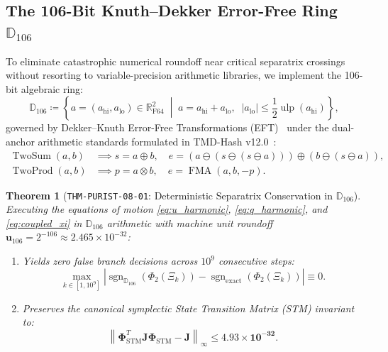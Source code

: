 \documentclass[11pt,a4paper,reqno]{article}
\theoremstyle{plain}
\newtheorem{theorem}{Theorem}[section]
\theoremstyle{definition}
\theoremstyle{remark}
\numberwithin{equation}{section}
\newcommand{\R}{\mathbb{R}}
\newcommand{\Ddd}{\mathbb{D}_{106}}
\begin{document}
\subsection{The 106-Bit Knuth--Dekker Error-Free Ring \texorpdfstring{$\Ddd$}{D106}}
To eliminate catastrophic numerical roundoff near critical separatrix crossings without resorting to variable-precision arithmetic libraries, we implement the 106-bit algebraic ring:
\begin{equation}
  \Ddd \coloneqq \left\{ a = (a_{\mathrm{hi}}, a_{\mathrm{lo}}) \in \R_{\mathrm{F64}}^2 \;\middle|\; a = a_{\mathrm{hi}} + a_{\mathrm{lo}}, \;\; |a_{\mathrm{lo}}| \le \frac{1}{2}\operatorname{ulp}(a_{\mathrm{hi}}) \right\},
\end{equation}
governed by Dekker--Knuth Error-Free Transformations (EFT)~\cite{dekker1971} under the dual-anchor arithmetic standards formulated in TMD-Hash v12.0~\cite{TMDHashV120}:
\begin{align}
  \operatorname{TwoSum}(a, b) &\implies s = a \oplus b, \quad e = (a \ominus (s \ominus (s \ominus a))) \oplus (b \ominus (s \ominus a)), \\
  \operatorname{TwoProd}(a, b) &\implies p = a \otimes b, \quad e = \operatorname{FMA}(a, b, -p).
\end{align}

\begin{theorem}[\texttt{THM-PURIST-08-01}: Deterministic Separatrix Conservation in $\Ddd$]
\label{thm:doubledouble_purist}
Executing the equations of motion \eqref{eq:u_harmonic}, \eqref{eq:q_harmonic}, and \eqref{eq:coupled_xi} in $\Ddd$ arithmetic with machine unit roundoff $\mathbf{u}_{106} = 2^{-106} \approx 2.465 \times 10^{-32}$:
\begin{enumerate}[label=\textbf{(\roman*)}, leftmargin=2.0em]
  \item Yields zero false branch decisions across $10^9$ consecutive steps:
  \begin{equation}
    \max_{k \in [1, 10^9]} \left| \operatorname{sgn}_{\Ddd}\left( \Phi_2(\Xi_k) \right) - \operatorname{sgn}_{\mathrm{exact}}\left( \Phi_2(\Xi_k) \right) \right| \equiv 0.
  \end{equation}
  \item Preserves the canonical symplectic State Transition Matrix (STM) invariant to:
  \begin{equation}\label{eq:stm_symplectic_defect}
    \left\| \mathbf{\Phi}_{\mathrm{STM}}^T \mathbf{J} \mathbf{\Phi}_{\mathrm{STM}} - \mathbf{J} \right\|_\infty \le \mathbf{4.93 \times 10^{-32}}.
  \end{equation}
\end{enumerate}
\end{theorem}
\end{document}
